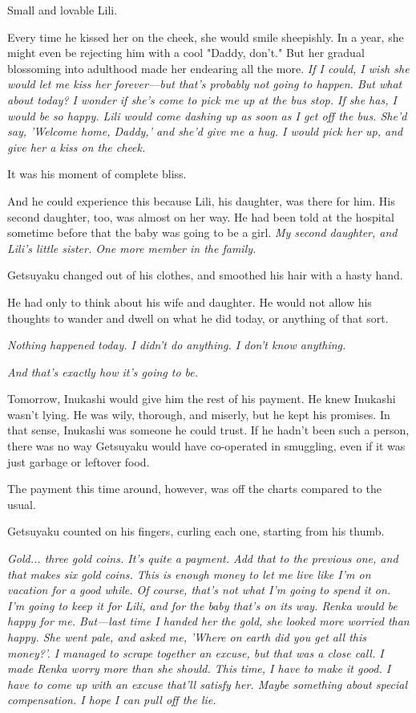 Small and lovable Lili.

Every time he kissed her on the cheek, she would smile sheepishly. In a
year, she might even be rejecting him with a cool "Daddy, don't." But
her gradual blossoming into adulthood made her endearing all the more.
\emph{If I could, I wish she would let me kiss her forever---but that's probably
not going to happen. But what about today? I wonder if she's come to
pick me up at the bus stop. If she has, I would be so happy. Lili would
come dashing up as soon as I get off the bus. She'd say, 'Welcome home,
Daddy,' and she'd give me a hug. I would pick her up, and give her a
kiss on the cheek.}

It was his moment of complete bliss.

And he could experience this because Lili, his daughter, was there for
him. His second daughter, too, was almost on her way. He had been told
at the hospital sometime before that the baby was going to be a girl. \emph{My
second daughter, and Lili's little sister. One more member in the
family.}

Getsuyaku changed out of his clothes, and smoothed his hair with a hasty
hand.

He had only to think about his wife and daughter. He would not allow his
thoughts to wander and dwell on what he did today, or anything of that
sort.

\emph{Nothing happened today. I didn't do anything. I don't know anything.}

\emph{And that's exactly how it's going to be.}

Tomorrow, Inukashi would give him the rest of his payment. He knew
Inukashi wasn't lying. He was wily, thorough, and miserly, but he kept
his promises. In that sense, Inukashi was someone he could trust. If he
hadn't been such a person, there was no way Getsuyaku would have
co-operated in smuggling, even if it was just garbage or leftover food.

The payment this time around, however, was off the charts compared to
the usual.

Getsuyaku counted on his fingers, curling each one, starting from his
thumb.

\emph{Gold... three gold coins. It's quite a payment. Add that to the previous
one, and that makes six gold coins. This is enough money to let me live
like I'm on vacation for a good while. Of course, that's not what I'm
going to spend it on. I'm going to keep it for Lili, and for the baby
that's on its way. Renka would be happy for me. But---last time I handed
her the gold, she looked more worried than happy. She went pale, and
asked me, 'Where on earth did you get all this money?'. I managed to
scrape together an excuse, but that was a close call. I made Renka worry
more than she should. This time, I have to make it good. I have to come
up with an excuse that'll satisfy her. Maybe something about special
compensation. I hope I can pull off the lie.}

